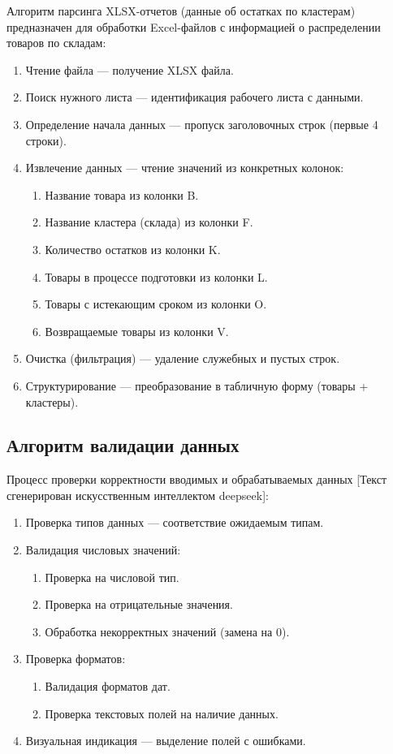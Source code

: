 Алгоритм парсинга XLSX-отчетов (данные об остатках по кластерам) предназначен для обработки Excel-файлов с информацией о распределении товаров по складам:
\begin{enumerate}
\item Чтение файла — получение XLSX файла.
\item Поиск нужного листа — идентификация рабочего листа с данными.
\item Определение начала данных — пропуск заголовочных строк (первые 4 строки).
\item Извлечение данных — чтение значений из конкретных колонок:
\begin{enumerate}
\item Название товара из колонки B.
\item Название кластера (склада) из колонки F.
\item Количество остатков из колонки K.
\item Товары в процессе подготовки из колонки L.
\item Товары с истекающим сроком из колонки O.
\item Возвращаемые товары из колонки V.
\end{enumerate}
\item Очистка (фильтрация) — удаление служебных и пустых строк.
\item Структурирование — преобразование в табличную форму (товары + кластеры).
\end{enumerate}

\subsection{Алгоритм валидации данных}

Процесс проверки корректности вводимых и обрабатываемых данных [Текст сгенерирован искусственным интеллектом deepseek]:
\begin{enumerate}
\item Проверка типов данных — соответствие ожидаемым типам.
\item Валидация числовых значений:
\begin{enumerate}
\item Проверка на числовой тип.
\item Проверка на отрицательные значения.
\item Обработка некорректных значений (замена на 0).
\end{enumerate}
\item Проверка форматов:
\begin{enumerate}
\item Валидация форматов дат.
\item Проверка текстовых полей на наличие данных.
\end{enumerate}
\item Визуальная индикация — выделение полей с ошибками.
\end{enumerate}


